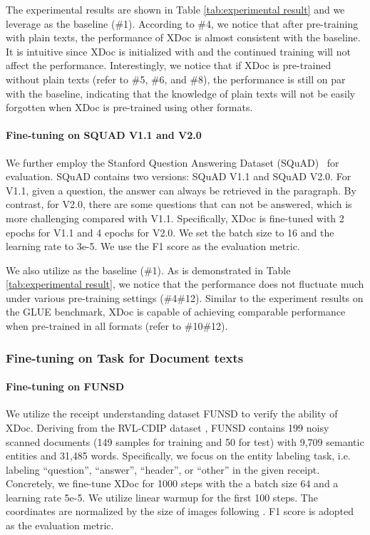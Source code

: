 \documentclass[11pt]{article}
\begin{document}
The experimental results are shown in Table \ref{tab:experimental result} and we leverage  \cite{liu2019roberta} as the baseline (\#1). According to \#4, we notice that after pre-training with plain texts, the performance of XDoc is almost consistent with the baseline. It is intuitive since XDoc is initialized with  and the continued training will not affect the performance. Interestingly, we notice that if XDoc is pre-trained without plain texts (refer to \#5, \#6, and \#8), the performance is still on par with the baseline, indicating that the knowledge of plain texts will not be easily forgotten when XDoc is pre-trained using other formats.

\paragraph{Fine-tuning on SQUAD V1.1 and V2.0}
We further employ the Stanford Question Answering Dataset (SQuAD)~\cite{rajpurkar2016squad,rajpurkar2018know} for evaluation. SQuAD contains two versions: SQuAD V1.1 and SQuAD V2.0. For V1.1, given a question, the answer can always be retrieved in the paragraph. By contrast, for V2.0, there are some questions that can not be answered, which is more challenging compared with V1.1. Specifically, XDoc is fine-tuned with 2 epochs for V1.1 and 4 epochs for V2.0. We set the batch size to 16 and the learning rate to 3e-5. We use the F1 score as the evaluation metric.

We also utilize  \cite{liu2019roberta} as the baseline (\#1). As is demonstrated in Table \ref{tab:experimental result}, we notice that the performance does not fluctuate much under various pre-training settings (\#4\#12). Similar to the experiment results on the GLUE benchmark, XDoc is capable of achieving comparable performance when pre-trained in all formats (refer to \#10\#12). 



\subsubsection{Fine-tuning on Task for Document texts}

\paragraph{Fine-tuning on FUNSD}
We utilize the receipt understanding dataset FUNSD \cite{jaume2019funsd} to verify the ability of XDoc. Deriving from the RVL-CDIP dataset \cite{harley2015evaluation}, FUNSD contains 199 noisy scanned documents (149 samples for training and 50 for test) with 9,709 semantic entities and 31,485 words. Specifically, we focus on the entity labeling task, i.e. labeling ``question'', ``answer'', ``header'', or ``other'' in the given receipt. Concretely, we fine-tune XDoc for 1000 steps with the a batch size 64 and a learning rate 5e-5. We utilize linear warmup for the first 100 steps. The coordinates are normalized by the size of images following \cite{xu2020layoutlm}. F1 score is adopted as the evaluation metric.
\end{document}
